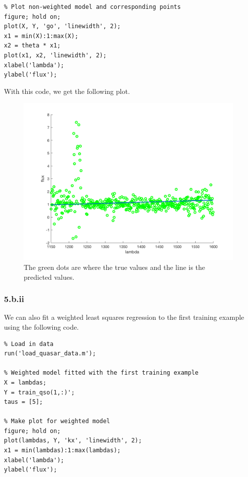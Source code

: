 \documentclass[11pt,a4paper,titlepage]{article}
\begin{document}
{{{\begin{lstlisting}
% Plot non-weighted model and corresponding points
figure; hold on;
plot(X, Y, 'go', 'linewidth', 2);
x1 = min(X):1:max(X);
x2 = theta * x1;
plot(x1, x2, 'linewidth', 2);
xlabel('lambda');
ylabel('flux');
\end{lstlisting}
With this code, we get the following plot.
\begin{figure}[h]
\centering
\includegraphics[width=6.5in]{ps1_5b1}
\caption{The green dots are where the true values and the line is the predicted values.}
\end{figure}
}\label{prob:5b1}
\subsubsection*{5.b.ii}{
We can also fit a weighted least squares regression to the first training example using the following code.
\begin{lstlisting}
% Load in data
run('load_quasar_data.m');

% Weighted model fitted with the first training example
X = lambdas;
Y = train_qso(1,:)';
taus = [5];

% Make plot for weighted model
figure; hold on;
plot(lambdas, Y, 'kx', 'linewidth', 2);
x1 = min(lambdas):1:max(lambdas);
xlabel('lambda');
ylabel('flux');


\end{lstlisting}}}}
\end{document}
